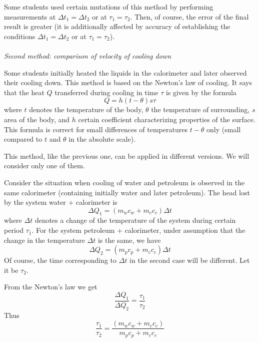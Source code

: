 \documentclass[12pt,a4paper]{book}
\begin{document}
	Some students used certain mutations of this method by performing measurements at $\Delta t_1=\Delta t_2$ or at $\tau_1=\tau_2$. Then, of course, the error of the f\mbox{}inal result is greater (it is additionally af\mbox{}fected by accuracy of establishing the conditions $\Delta t_1=\Delta t_2$ or at $\tau_1=\tau_2$).\\ \\
	\noindent\emph{Second method: comparison of velocity of cooling down}\par
	Some students initially heated the liquids in the calorimeter and later observed their cooling down. This method is based on the Newton's law of cooling. It says that the heat $Q$ transferred during cooling in time $\tau$ is given by the formula
	\begin{equation*}
		Q=h(t-\theta)s\tau
	\end{equation*}
	where $t$ denotes the temperature of the body, $\theta$ the temperature of surrounding, $s$ area of the body, and $h$ certain coef\mbox{}f\mbox{}icient characterizing properties of the surface. This formula is correct for small dif\mbox{}ferences of temperatures $t-\theta$ only (small compared to $t$ and $\theta$ in the absolute scale).\par
	This method, like the previous one, can be applied in dif\mbox{}ferent versions. We will consider only one of them.\par
	Consider the situation when cooling of water and petroleum is observed in the same calorimeter (containing initially water and later petroleum). The head lost by the system water + calorimeter is
	\begin{equation*}
		\Delta Q_1=(m_wc_w+m_cc_c)\Delta t
	\end{equation*}
	where $\Delta t$ denotes a change of the temperature of the system during certain period $\tau_1$. For the system petroleum + calorimeter, under assumption that the change in the temperature $\Delta t$ is the same, we have
	\begin{equation*}
		\Delta Q_2=(m_pc_p+m_cc_c)\Delta t
	\end{equation*}
	Of course, the time corresponding to $\Delta t$ in the second case will be dif\mbox{}ferent. Let it be $\tau_2$.\par
	From the Newton's law we get
	\begin{equation*}
		\frac{\Delta Q_1}{\Delta Q_2}=\frac{\tau_1}{\tau_2}
	\end{equation*}
	Thus
	\begin{equation*}
		\frac{\tau_1}{\tau_2}=\frac{(m_wc_w+m_cc_c)}{m_pc_p+m_cc_c}
	\end{equation*}
\end{document}

